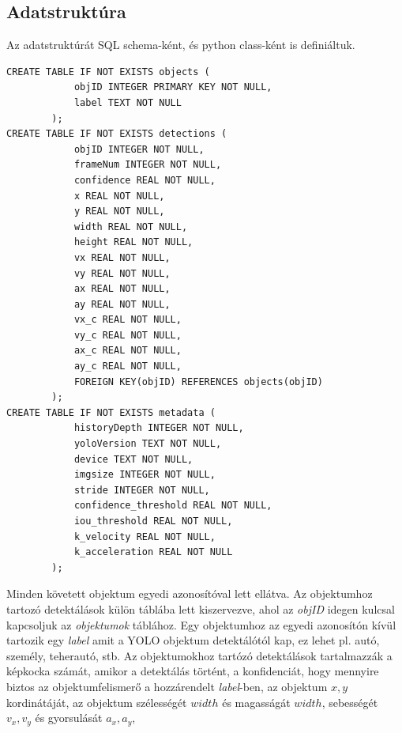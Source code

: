 \documentclass[acmtog, authorversion]{acmart}
\begin{document}
\subsection{Adatstruktúra}
Az adatstruktúrát SQL schema-ként, és python class-ként is definiáltuk.
\begin{verbatim}
CREATE TABLE IF NOT EXISTS objects (
            objID INTEGER PRIMARY KEY NOT NULL,
            label TEXT NOT NULL
        );
CREATE TABLE IF NOT EXISTS detections (
            objID INTEGER NOT NULL,
            frameNum INTEGER NOT NULL,
            confidence REAL NOT NULL,
            x REAL NOT NULL,
            y REAL NOT NULL,
            width REAL NOT NULL,
            height REAL NOT NULL,
            vx REAL NOT NULL,
            vy REAL NOT NULL,
            ax REAL NOT NULL,
            ay REAL NOT NULL,
            vx_c REAL NOT NULL,
            vy_c REAL NOT NULL,
            ax_c REAL NOT NULL,
            ay_c REAL NOT NULL,
            FOREIGN KEY(objID) REFERENCES objects(objID)
        );
CREATE TABLE IF NOT EXISTS metadata (
            historyDepth INTEGER NOT NULL,
            yoloVersion TEXT NOT NULL,   
            device TEXT NOT NULL,
            imgsize INTEGER NOT NULL,
            stride INTEGER NOT NULL,
            confidence_threshold REAL NOT NULL,
            iou_threshold REAL NOT NULL,
            k_velocity REAL NOT NULL,
            k_acceleration REAL NOT NULL
        );
\end{verbatim}
Minden követett objektum egyedi azonosítóval lett ellátva. Az objektumhoz tartozó detektálások külön táblába lett kiszervezve,
ahol az \textit{objID} idegen kulcsal kapcsoljuk az \textit{objektumok} táblához. Egy objektumhoz az egyedi azonosítón kívül
tartozik egy \textit{label} amit a YOLO objektum detektálótól kap, ez lehet pl. autó, személy, teherautó, stb. Az objektumokhoz
tartózó detektálások tartalmazzák a képkocka számát, amikor a detektálás történt, a konfidenciát, hogy mennyire biztos az
objektumfelismerő a hozzárendelt \textit{label}-ben, az objektum \begin{math}x,y\end{math} kordinátáját, az objektum szélességét
\begin{math}width\end{math} és magasságát \begin{math}width\end{math}, sebességét \begin{math}v_x,v_y\end{math} és gyorsulását \begin{math}a_x,a_y\end{math}, 
\end{document}
